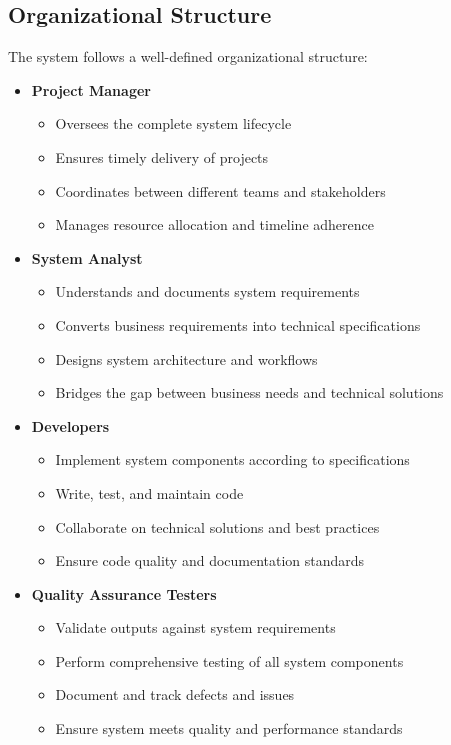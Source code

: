 \documentclass[12pt,a4paper]{article}
\begin{document}
\subsection{Organizational Structure}
The system follows a well-defined organizational structure:

\begin{itemize}
    \item \textbf{Project Manager}
    \begin{itemize}
        \item Oversees the complete system lifecycle
        \item Ensures timely delivery of projects
        \item Coordinates between different teams and stakeholders
        \item Manages resource allocation and timeline adherence
    \end{itemize}
    
    \item \textbf{System Analyst}
    \begin{itemize}
        \item Understands and documents system requirements
        \item Converts business requirements into technical specifications
        \item Designs system architecture and workflows
        \item Bridges the gap between business needs and technical solutions
    \end{itemize}
    
    \item \textbf{Developers}
    \begin{itemize}
        \item Implement system components according to specifications
        \item Write, test, and maintain code
        \item Collaborate on technical solutions and best practices
        \item Ensure code quality and documentation standards
    \end{itemize}
    
    \item \textbf{Quality Assurance Testers}
    \begin{itemize}
        \item Validate outputs against system requirements
        \item Perform comprehensive testing of all system components
        \item Document and track defects and issues
        \item Ensure system meets quality and performance standards
    \end{itemize}
\end{itemize}
\end{document}
